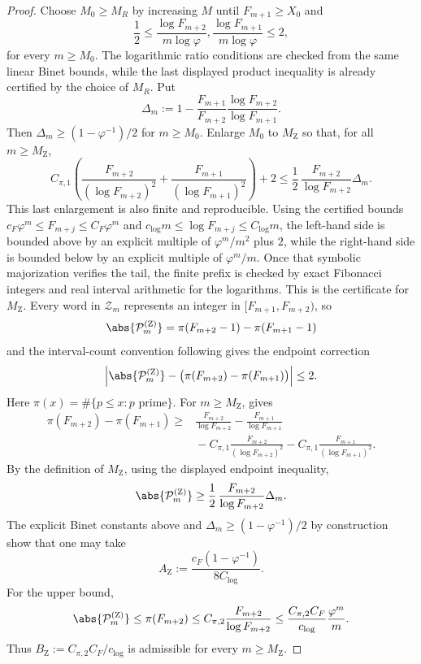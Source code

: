 \begin{proof}
  Choose \(M_0\ge M_R\) by increasing \(M\) until \(F_{m+1}\ge X_0\)
  and
  \[
    \frac12\le
    \frac{\log F_{m+2}}{m\log\varphi},
    \frac{\log F_{m+1}}{m\log\varphi}
    \le2,
  \]
  for every \(m\ge M_0\). The logarithmic ratio conditions are checked
  from the same linear Binet bounds, while the last displayed
  product inequality is already certified by the choice of \(M_R\). Put
  \[
    \Delta_m:=
    1-\frac{F_{m+1}}{F_{m+2}}
      \frac{\log F_{m+2}}{\log F_{m+1}}.
  \]
  Then \(\Delta_m\ge(1-\varphi^{-1})/2\) for \(m\ge M_0\). Enlarge
  \(M_0\) to \(M_{\mathrm Z}\) so that, for all \(m\ge M_{\mathrm Z}\),
  \[
    C_{\pi,1}\left(
      \frac{F_{m+2}}{(\log F_{m+2})^2}
      +\frac{F_{m+1}}{(\log F_{m+1})^2}\right)+2
    \le
    \frac12\,\frac{F_{m+2}}{\log F_{m+2}}\Delta_m .
  \]
  This last enlargement is also finite and reproducible. Using the
  certified bounds \(c_F\varphi^m\le F_{m+j}\le C_F\varphi^m\) and
  \(c_{\log}m\le\log F_{m+j}\le C_{\log}m\), the left-hand side is
  bounded above by an explicit multiple of \(\varphi^m/m^2\) plus \(2\),
  while the right-hand side is bounded below by an explicit multiple of
  \(\varphi^m/m\). Once that symbolic majorization verifies the tail,
  the finite prefix is checked by exact Fibonacci integers and real
  interval arithmetic for the logarithms. This is the certificate for
  \(M_{\mathrm Z}\).
  Every word in \(\mathcal Z_m\) represents an integer in
  \([F_{m+1},F_{m+2})\), so
  \[
    \abs{\mathcal P_m^{(\mathrm Z)}}
    =\pi(F_{m+2}-1)-\pi(F_{m+1}-1)
  \]
  and the interval-count convention following
   gives the endpoint correction
  \[
    \left|
      \abs{\mathcal P_m^{(\mathrm Z)}}-
      \bigl(\pi(F_{m+2})-\pi(F_{m+1})\bigr)
    \right|\le 2.
  \]
  Here \(\pi(x)=\#\{p\le x:p\text{ prime}\}\). For
  \(m\ge M_{\mathrm Z}\),  gives
  \[
    \begin{aligned}
    \pi(F_{m+2})-\pi(F_{m+1})
    \ge
    &\frac{F_{m+2}}{\log F_{m+2}}
      -\frac{F_{m+1}}{\log F_{m+1}}\\
    &{}-C_{\pi,1}\frac{F_{m+2}}{(\log F_{m+2})^2}
      -C_{\pi,1}\frac{F_{m+1}}{(\log F_{m+1})^2}.
    \end{aligned}
  \]
  By the definition of \(M_{\mathrm Z}\), using the displayed endpoint
  inequality,
  \[
    \abs{\mathcal P_m^{(\mathrm Z)}}
    \ge \frac12\,\frac{F_{m+2}}{\log F_{m+2}}\Delta_m .
  \]
  The explicit Binet constants above and
  \(\Delta_m\ge(1-\varphi^{-1})/2\) by construction show that one may
  take
  \[
    A_{\mathrm Z}:=\frac{c_F(1-\varphi^{-1})}{8C_{\log}}.
  \]
  For the upper bound,
  \[
    \abs{\mathcal P_m^{(\mathrm Z)}}\le \pi(F_{m+2})
      \le C_{\pi,2}\frac{F_{m+2}}{\log F_{m+2}}
      \le \frac{C_{\pi,2}C_F}{c_{\log}}\frac{\varphi^m}{m}.
  \]
  Thus \(B_{\mathrm Z}:=C_{\pi,2}C_F/c_{\log}\) is admissible for every
  \(m\ge M_{\mathrm Z}\).
\end{proof}

